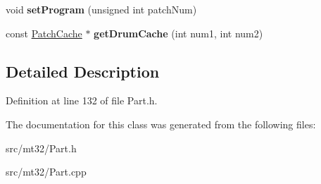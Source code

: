 \begin{DoxyCompactItemize}
\item 
\hypertarget{classMT32Emu_1_1RhythmPart_aa5af09d4067a238145b647bf60aacdcc}{void {\bfseries set\-Program} (unsigned int patch\-Num)}\label{classMT32Emu_1_1RhythmPart_aa5af09d4067a238145b647bf60aacdcc}

\item 
\hypertarget{classMT32Emu_1_1RhythmPart_ad0e23c5ba67594919eb05b80fd13f482}{const \hyperlink{structMT32Emu_1_1PatchCache}{Patch\-Cache} $\ast$ {\bfseries get\-Drum\-Cache} (int num1, int num2)}\label{classMT32Emu_1_1RhythmPart_ad0e23c5ba67594919eb05b80fd13f482}

\end{DoxyCompactItemize}


\subsection{Detailed Description}


Definition at line 132 of file Part.\-h.



The documentation for this class was generated from the following files\-:\begin{DoxyCompactItemize}
\item 
src/mt32/Part.\-h\item 
src/mt32/Part.\-cpp\end{DoxyCompactItemize}
